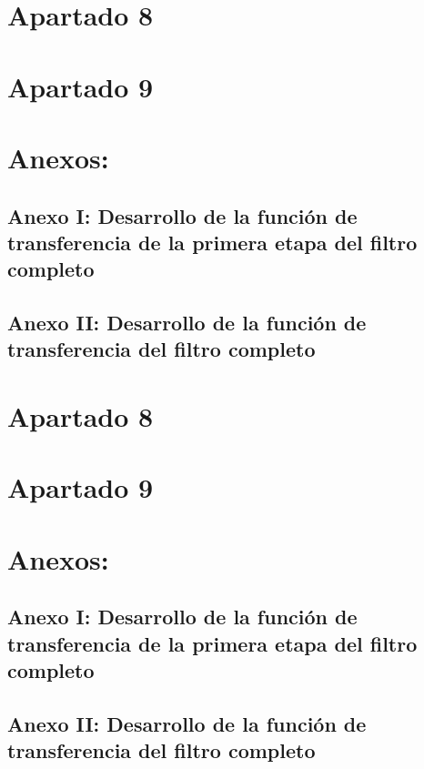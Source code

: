 \documentclass[12pt]{article}
\begin{document}
 \section*{Apartado 8}
 \section*{Apartado 9}
 \newpage
 \section*{Anexos: }
 \subsection*{Anexo I: Desarrollo de la función de transferencia de la primera etapa del filtro completo}
 \subsection*{Anexo II: Desarrollo de la función de transferencia del filtro completo}
  \section*{Apartado 8}
  \section*{Apartado 9}
  \newpage
  \section*{Anexos: }
  \subsection*{Anexo I: Desarrollo de la función de transferencia de la primera etapa del filtro completo}
  \subsection*{Anexo II: Desarrollo de la función de transferencia del filtro completo}
\end{document}
